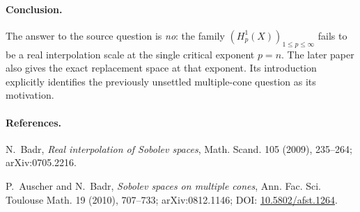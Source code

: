 \documentclass[10pt]{article}
\begin{document}
\paragraph{Conclusion.}
The answer to the source question is \emph{no}: the family
$(H_p^1(X))_{1\le p\le\infty}$ fails to be a real interpolation scale at the
single critical exponent $p=n$.  The later paper also gives the exact
replacement space at that exponent.  Its introduction explicitly identifies
the previously unsettled multiple-cone question as its motivation.

\paragraph{References.}
N.~Badr, \emph{Real interpolation of Sobolev spaces}, Math. Scand.
105 (2009), 235--264; arXiv:0705.2216.

P.~Auscher and N.~Badr, \emph{Sobolev spaces on multiple cones}, Ann.
Fac. Sci. Toulouse Math. 19 (2010), 707--733;
arXiv:0812.1146; DOI: \href{https://doi.org/10.5802/afst.1264}{10.5802/afst.1264}.
\end{document}
